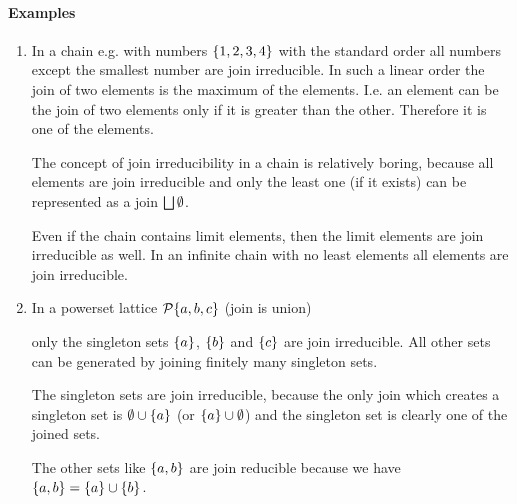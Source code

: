 \paragraph{Examples}
\begin{enumerate}
    \item In a chain e.g. with numbers $\left\{1,2,3,4\right\}$ with the standard order
        all numbers except the smallest number are join irreducible.
        In such a linear order the join of two elements is the maximum of the
        elements. I.e. an element can be the join of two elements only if it is
        greater than the other. Therefore it is one of the elements.

        The concept of join irreducibility in a chain is relatively boring,
        because all elements are join irreducible and only the least one (if it
        exists) can be represented as a join $\bigsqcup \emptyset$.

        Even if the chain contains limit elements, then the limit elements are join
        irreducible as well. In an infinite chain with no least elements all
        elements are join irreducible.

    \item In a powerset lattice ${\mathcal P}{\left\{a,b,c\right\}}$ (join is union)


        \noindent only
        the singleton sets $\left\{a\right\}$, $\left\{b\right\}$ and $\left\{c\right\}$ are join
        irreducible. All other sets can be generated by joining finitely many
        singleton sets.

        The singleton sets are join irreducible, because the only join which
        creates a singleton set is $\emptyset \cup \left\{a\right\}$ (or $\left\{a\right\} \cup
        \emptyset$) and the singleton set is clearly one of the joined sets.

        The other sets like $\left\{a,b\right\}$ are join reducible because we have
        $\left\{a,b\right\} = \left\{a\right\} \cup \left\{b\right\}$.



\end{enumerate}
